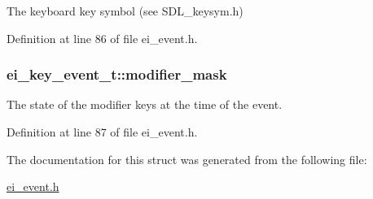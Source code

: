 The keyboard key symbol (see S\+D\+L\+\_\+keysym.\+h) 



Definition at line 86 of file ei\+\_\+event.\+h.

\hypertarget{structei__key__event__t_a35e4dc6d788b9fdd4eeedf716662afab}{
\subsubsection[{modifier\+\_\+mask}]{ ei\+\_\+key\+\_\+event\+\_\+t\+::modifier\+\_\+mask}}\label{structei__key__event__t_a35e4dc6d788b9fdd4eeedf716662afab}


The state of the modifier keys at the time of the event. 



Definition at line 87 of file ei\+\_\+event.\+h.



The documentation for this struct was generated from the following file\+:\begin{DoxyCompactItemize}
\item 
\hyperlink{ei__event_8h}{ei\+\_\+event.\+h}\end{DoxyCompactItemize}
